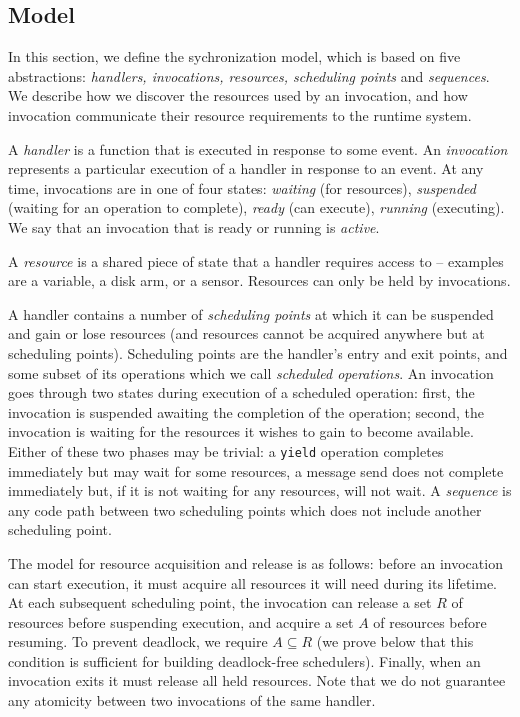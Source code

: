 \documentclass[10pt]{article}
\begin{document}
\subsection{Model}

In this section, we define the sychronization model, which is based on
five abstractions: \emph{handlers, invocations, resources, scheduling
points} and \emph{sequences}. We describe how we discover the
resources used by an invocation, and how invocation communicate their
resource requirements to the runtime system.

A \emph{handler} is a function that is executed in response to some
event. An \emph{invocation} represents a particular execution of a
handler in response to an event. At any time, invocations are in one
of four states: \emph{waiting} (for resources), \emph{suspended}
(waiting for an operation to complete), \emph{ready} (can execute),
\emph{running} (executing). We say that an invocation that is ready or
running is \emph{active}.

A \emph{resource} is a shared piece of state that a handler requires
access to -- examples are a variable, a disk arm, or a sensor.
Resources can only be held by invocations.

A handler contains a number of \emph{scheduling points} at which it can be
suspended and gain or lose resources (and resources cannot be acquired
anywhere but at scheduling points). Scheduling points are the handler's
entry and exit points, and some subset of its operations which we call
\emph{scheduled operations}. An invocation goes through two states during
execution of a scheduled operation: first, the invocation is suspended
awaiting the completion of the operation; second, the invocation is
waiting for the resources it wishes to gain to become
available. Either of these two phases may be trivial: a {\tt yield}
operation completes immediately but may wait for some resources, a
message send does not complete immediately but, if it is not waiting
for any resources, will not wait. A \emph{sequence} is any code path
between two scheduling points which does not include another
scheduling point.

The model for resource acquisition and release is as follows: before
an invocation can start execution, it must acquire all resources it
will need during its lifetime. At each subsequent scheduling point,
the invocation can release a set $R$ of resources before suspending
execution, and acquire a set $A$ of resources before resuming. To
prevent deadlock, we require $A
\subseteq R$ (we prove below that this condition is sufficient for building
deadlock-free schedulers). Finally, when an invocation exits it must
release all held resources. Note that we do not guarantee any atomicity
between two invocations of the same handler.
\end{document}
